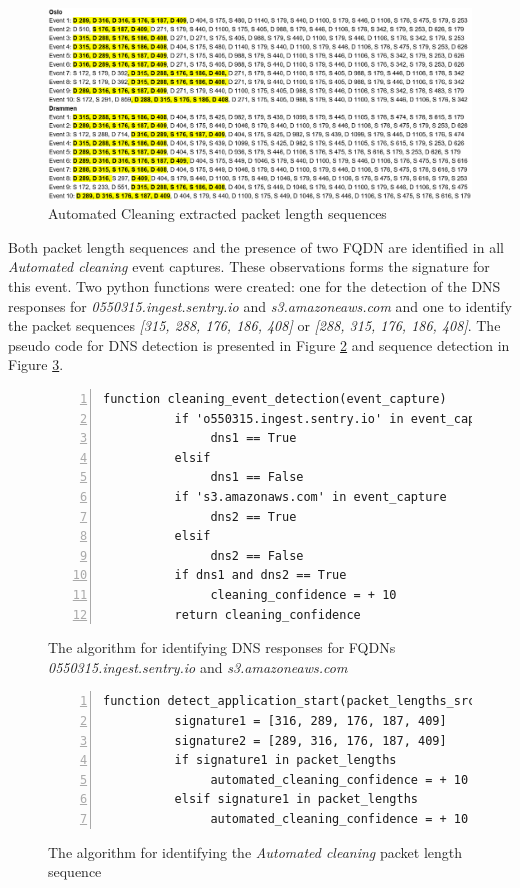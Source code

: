 \begin{figure}[H]
    \centering
    \includegraphics[width=\textwidth]{figures/Sequence_AC.png}
    \caption{Automated Cleaning extracted packet length sequences}
    \label{fig:ACseq}
\end{figure}

Both packet length sequences and the presence of two \gls{FQDN} are identified in all \textit{Automated cleaning} event captures. These observations forms the signature for this event. Two python functions were created: one for the detection of the \gls{DNS} responses for \textit{0550315.ingest.sentry.io} and \textit{s3.amazoneaws.com} and one to identify the packet sequences \textit{[315, 288, 176, 186, 408]} or \textit{[288, 315, 176, 186, 408]}. The pseudo code for \gls{DNS} detection is presented in Figure \ref{fig:pesudo_code_cleaning_event} and sequence detection in Figure \ref{fig:Pesudo_code_AC}.

\begin{figure}[H]
    \centering
    \begin{lstlisting}[numbers=left]
     function cleaning_event_detection(event_capture)
          if 'o550315.ingest.sentry.io' in event_capture
               dns1 == True
          elsif
               dns1 == False
          if 's3.amazonaws.com' in event_capture
               dns2 == True
          elsif
               dns2 == False
          if dns1 and dns2 == True      
               cleaning_confidence = + 10
          return cleaning_confidence
    \end{lstlisting}
    \caption{The algorithm for identifying \gls{DNS} responses for FQDNs \textit{0550315.ingest.sentry.io} and \textit{s3.amazoneaws.com}}
    \label{fig:pesudo_code_cleaning_event}
\end{figure}

\begin{figure}[H]
    \centering
    \begin{lstlisting}[numbers=left]
     function detect_application_start(packet_lengths_src)
          signature1 = [316, 289, 176, 187, 409]
          signature2 = [289, 316, 176, 187, 409]
          if signature1 in packet_lengths
               automated_cleaning_confidence = + 10
          elsif signature1 in packet_lengths
               automated_cleaning_confidence = + 10
    \end{lstlisting}
    \caption{The algorithm for identifying the \textit{Automated cleaning} packet length sequence}
    \label{fig:Pesudo_code_AC}
\end{figure}

